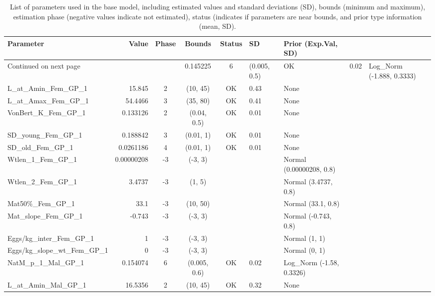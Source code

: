 \documentclass[12pt,]{article}
\begin{document}
\begin{landscape}
\begin{longtable}{lrcccll}
\caption{List of parameters used in
                                          the base model, including estimated 
                                          values and standard deviations (SD), 
                                          bounds (minimum and maximum), 
                                          estimation phase (negative values indicate
                                          not estimated), status (indicates if 
                                          parameters are near bounds, and prior type
                                          information (mean, SD).} \\ 
  \hline
Parameter & Value & Phase & Bounds & Status & SD & Prior (Exp.Val, SD)  \\ 
  \hline 
\endhead 
\hline 
\multicolumn{3}{l}{\footnotesize Continued on next page} 
\endfoot 
\endlastfoot 
 \hline
NatM\_p\_1\_Fem\_GP\_1 & 0.145225 & 6 & (0.005, 0.5) & OK & 0.02 & Log\_Norm (-1.888, 0.3333) \\ 
  L\_at\_Amin\_Fem\_GP\_1 & 15.845 & 2 & (10, 45) & OK & 0.43 & None \\ 
  L\_at\_Amax\_Fem\_GP\_1 & 54.4466 & 3 & (35, 80) & OK & 0.41 & None \\ 
  VonBert\_K\_Fem\_GP\_1 & 0.133126 & 2 & (0.04, 0.5) & OK & 0.01 & None \\ 
  SD\_young\_Fem\_GP\_1 & 0.188842 & 3 & (0.01, 1) & OK & 0.01 & None \\ 
  SD\_old\_Fem\_GP\_1 & 0.0261186 & 4 & (0.01, 1) & OK & 0.01 & None \\ 
  Wtlen\_1\_Fem\_GP\_1 & 0.00000208 & -3 & (-3, 3) &  &  & Normal (0.00000208, 0.8) \\ 
  Wtlen\_2\_Fem\_GP\_1 & 3.4737 & -3 & (1, 5) &  &  & Normal (3.4737, 0.8) \\ 
  Mat50\%\_Fem\_GP\_1 & 33.1 & -3 & (10, 50) &  &  & Normal (33.1, 0.8) \\ 
  Mat\_slope\_Fem\_GP\_1 & -0.743 & -3 & (-3, 3) &  &  & Normal (-0.743, 0.8) \\ 
  Eggs/kg\_inter\_Fem\_GP\_1 & 1 & -3 & (-3, 3) &  &  & Normal (1, 1) \\ 
  Eggs/kg\_slope\_wt\_Fem\_GP\_1 & 0 & -3 & (-3, 3) &  &  & Normal (0, 1) \\ 
  NatM\_p\_1\_Mal\_GP\_1 & 0.154074 & 6 & (0.005, 0.6) & OK & 0.02 & Log\_Norm (-1.58, 0.3326) \\ 
  L\_at\_Amin\_Mal\_GP\_1 & 16.5356 & 2 & (10, 45) & OK & 0.32 & None \\ 

\end{longtable}
\end{landscape}
\end{document}
